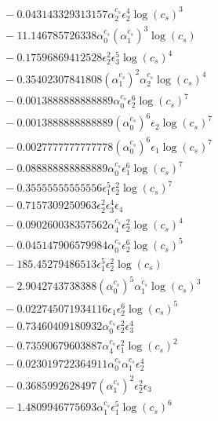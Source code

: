 \documentclass[10pt]{article}
\begin{document}
\begin{align*}
&{}  - 0.043143329313157 \alpha_{2}^{c_s} \epsilon_{2}^{4} \log{\left(c_{s} \right)}^{3} \\
&{}  - 11.146785726338 \alpha_{0}^{c_s} \left(\alpha_{1}^{c_s}\right)^{3} \log{\left(c_{s} \right)} \\
&{}  - 0.17596869412528 \epsilon_{2}^{2} \epsilon_{3}^{5} \log{\left(c_{s} \right)}^{4} \\
&{}  - 0.35402307841808 \left(\alpha_{1}^{c_s}\right)^{2} \alpha_{2}^{c_s} \log{\left(c_{s} \right)}^{4} \\
&{}  - 0.0013888888888889 \alpha_{0}^{c_s} \epsilon_{2}^{6} \log{\left(c_{s} \right)}^{7} \\
&{}  - 0.0013888888888889 \left(\alpha_{0}^{c_s}\right)^{6} \epsilon_{2} \log{\left(c_{s} \right)}^{7} \\
&{}  - 0.0027777777777778 \left(\alpha_{0}^{c_s}\right)^{6} \epsilon_{1} \log{\left(c_{s} \right)}^{7} \\
&{}  - 0.088888888888889 \alpha_{0}^{c_s} \epsilon_{1}^{6} \log{\left(c_{s} \right)}^{7} \\
&{}  - 0.35555555555556 \epsilon_{1}^{5} \epsilon_{2}^{2} \log{\left(c_{s} \right)}^{7} \\
&{}  - 0.7157309250963 \epsilon_{2}^{2} \epsilon_{3}^{4} \epsilon_{4} \\
&{}  - 0.090260038357562 \alpha_{4}^{c_s} \epsilon_{2}^{2} \log{\left(c_{s} \right)}^{4} \\
&{}  - 0.045147906579984 \alpha_{0}^{c_s} \epsilon_{2}^{6} \log{\left(c_{s} \right)}^{5} \\
&{}  - 185.45279486513 \epsilon_{1}^{5} \epsilon_{2}^{2} \log{\left(c_{s} \right)} \\
&{}  - 2.9042743738388 \left(\alpha_{0}^{c_s}\right)^{5} \alpha_{1}^{c_s} \log{\left(c_{s} \right)}^{3} \\
&{}  - 0.022745071934116 \epsilon_{1} \epsilon_{2}^{6} \log{\left(c_{s} \right)}^{5} \\
&{}  - 0.73460409180932 \alpha_{0}^{c_s} \epsilon_{2}^{2} \epsilon_{3}^{4} \\
&{}  - 0.73590679603887 \alpha_{4}^{c_s} \epsilon_{1}^{2} \log{\left(c_{s} \right)}^{2} \\
&{}  - 0.023019722364911 \alpha_{0}^{c_s} \alpha_{1}^{c_s} \epsilon_{2}^{4} \\
&{}  - 0.3685992628497 \left(\alpha_{1}^{c_s}\right)^{2} \epsilon_{2}^{2} \epsilon_{3} \\
&{}  - 1.4809946775693 \alpha_{1}^{c_s} \epsilon_{1}^{5} \log{\left(c_{s} \right)}^{6} \\

\end{align*}
\end{document}
